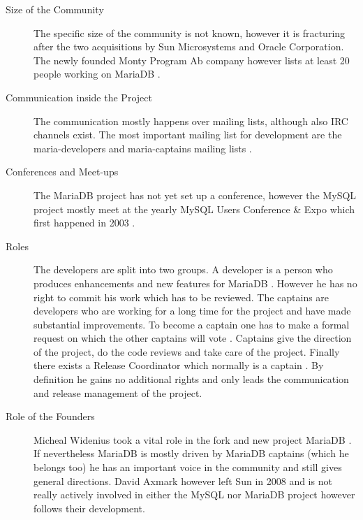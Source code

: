 \begin{description}

  \item[Size of the Community] The specific size of the community is not
    known, however it is fracturing after the two acquisitions by Sun
    Microsystems and Oracle Corporation. The newly founded Monty Program Ab
    company however lists at least 20 people working on MariaDB
    \cite{MySQLBehind}.

  \item[Communication inside the Project] The communication mostly happens
    over mailing lists, although also \ac{IRC} channels exist. The most
    important mailing list for development are the maria-developers and
    maria-captains mailing lists \cite{MySQLDevelopers}.

  \item[Conferences and Meet-ups] The MariaDB project has not yet set up a
    conference, however the MySQL project mostly meet at the yearly MySQL
    Users Conference \& Expo which first happened in 2003
    \cite{MySQLConference}.

  \item[Roles] The developers are split into two groups. A developer is a
    person who produces enhancements and new features for MariaDB
    \cite{MySQLContributingCode,MySQLContributing,MySQLCaptain}. However he
    has no right to commit his work which has to be reviewed. The captains
    are developers who are working for a long time for the project and have
    made substantial improvements. To become a captain one has to make a
    formal request on which the other captains will vote \cite{MySQLCaptain}.
    Captains give the direction of the project, do the code reviews and take
    care of the project. Finally there exists a Release Coordinator which
    normally is a captain \cite{MySQLReleaseCoordinator}. By definition he
    gains no additional rights and only leads the communication and release
    management of the project.

  \item[Role of the Founders] Micheal Widenius took a vital role in the fork
    and new project MariaDB \cite{MySQLBehind,MySQLAbout}. If nevertheless
    MariaDB is mostly driven by MariaDB captains (which he belongs too) he
    has an important voice in the community and still gives general
    directions. David Axmark however left Sun in 2008 and is not really
    actively involved in either the MySQL nor MariaDB project however follows
    their development.

\end{description}

